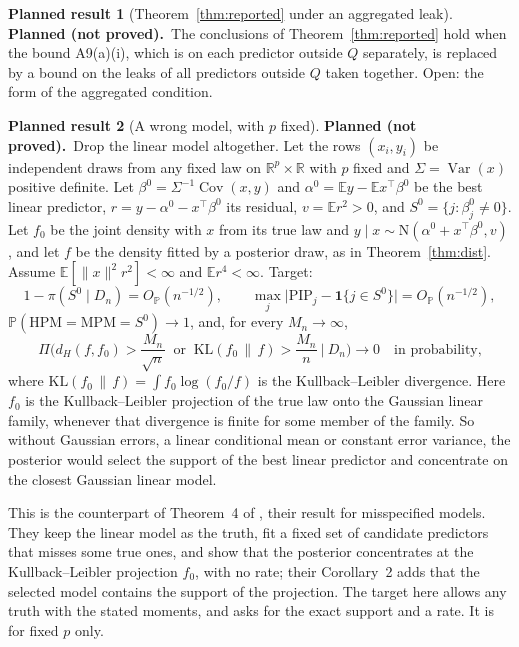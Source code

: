 \documentclass[11pt]{article}
\newcommand{\R}{\mathbb{R}}
\renewcommand{\P}{\mathbb{P}}
\newcommand{\E}{\mathbb{E}}
\newcommand{\N}{\mathrm{N}}
\newcommand{\norm}[1]{\lVert #1\rVert}
\newcommand{\ind}[1]{\mathbf{1}\{#1\}}
\newcommand{\Cov}{\operatorname{Cov}}
\newcommand{\Var}{\operatorname{Var}}
\newcommand{\PIP}{\mathrm{PIP}}
\newcommand{\HPM}{\mathrm{HPM}}
\newcommand{\MPM}{\mathrm{MPM}}
\newcommand{\OP}{O_{\P}}
\newcommand{\Dn}{D_n}
\theoremstyle{plain}
\theoremstyle{definition}
\newtheorem{planned}{Planned result}
\newcommand{\notproved}{\textbf{Planned (not proved).}\ }
\begin{document}
\begin{planned}[Theorem~\ref{thm:reported} under an aggregated leak]
\notproved The conclusions of Theorem~\ref{thm:reported} hold when the bound A9(a)(i), which is on each predictor
outside $Q$ separately, is replaced by a bound on the leaks of all predictors outside $Q$ taken together. Open: the
form of the aggregated condition.
\end{planned}

\begin{planned}[A wrong model, with $p$ fixed]
\notproved Drop the linear model altogether. Let the rows $(x_i,y_i)$ be independent draws from any fixed law on
$\R^p\times\R$ with $p$ fixed and $\Sigma=\Var(x)$ positive definite. Let $\beta^0=\Sigma^{-1}\Cov(x,y)$ and
$\alpha^0=\E y-\E x^\top\beta^0$ be the best linear predictor, $r=y-\alpha^0-x^\top\beta^0$ its residual, $v=\E
r^2>0$, and $S^0=\{j:\beta^0_j\neq0\}$. Let $f_0$ be the joint density with $x$ from its true law and $y\mid
x\sim\N(\alpha^0+x^\top\beta^0,v)$, and let $f$ be the density fitted by a posterior draw, as in
Theorem~\ref{thm:dist}. Assume $\E[\norm{x}^2r^2]<\infty$ and $\E r^4<\infty$. Target:
\[
  1-\pi(S^0\mid\Dn)=\OP(n^{-1/2}),\qquad \max_j\big|\PIP_j-\ind{j\in S^0}\big|=\OP(n^{-1/2}),
\]
$\P(\HPM=\MPM=S^0)\to1$, and, for every $M_n\to\infty$,
\[
  \Pi\Big(d_H(f,f_0)>\frac{M_n}{\sqrt n}\ \text{ or }\ \mathrm{KL}(f_0\,\|\,f)>\frac{M_n}{n}\ \Big|\ \Dn\Big)\to0\quad\text{in probability,}
\]
where $\mathrm{KL}(f_0\,\|\,f)=\int f_0\log(f_0/f)$ is the Kullback--Leibler divergence. Here $f_0$ is the
Kullback--Leibler projection of the true law onto the Gaussian linear family, whenever that divergence is finite for
some member of the family. So without Gaussian errors, a linear conditional mean or constant error variance, the
posterior would select the support of the best linear predictor and concentrate on the closest Gaussian linear model.

This is the counterpart of Theorem~4 of \citet{SongLiang2015}, their result for misspecified models. They keep the
linear model as the truth, fit a fixed set of candidate predictors that misses some true ones, and show that the
posterior concentrates at the Kullback--Leibler projection $f_0$, with no rate; their Corollary~2 adds that the
selected model contains the support of the projection. The target here allows any truth with the stated moments, and
asks for the exact support and a rate. It is for fixed $p$ only.
\end{planned}



\end{document}
